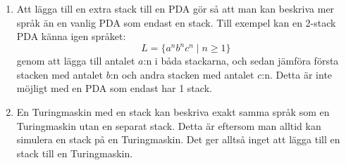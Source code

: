 \documentclass{article}
\begin{document}
\begin{enumerate}[label=(\alph*)]
    \item Att lägga till en extra stack till en PDA gör så att man kan beskriva mer språk än en vanlig PDA som endast en stack. Till exempel kan en 2-stack PDA känna igen språket:
    $$L = \{a^nb^nc^n \mid n \ge 1 \}$$
    genom att lägga till antalet $a$:n i båda stackarna, och sedan jämföra första stacken med antalet $b$:n och andra stacken med antalet $c$:n.
    Detta är inte möjligt med en PDA som endast har 1 stack.
    
    \item En Turingmaskin med en stack kan beskriva exakt samma språk som en Turingmaskin utan en separat stack. Detta är eftersom man alltid kan simulera en stack på en Turingmaskin. Det ger alltså inget att lägga till en stack till en Turingmaskin.
\end{enumerate}
\section{}
\end{document}
